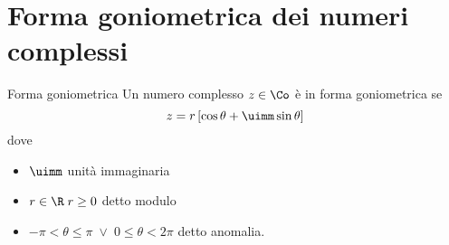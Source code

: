 \chapter{Forma goniometrica dei numeri complessi}
\begin{definizionet}{Forma goniometrica}{}
Un numero complesso $z\in\Co$ è in forma goniometrica se
\[z=r\left[\cos\theta+\uimm\sin\theta \right] \] dove
\begin{itemize}
\item $\uimm$ unità immaginaria
\item $r\in\R\; r\geq 0$ detto modulo
\item $-\pi <\theta\leq\pi\; \vee\; 0\leq\theta<2\pi$ detto anomalia.
\end{itemize}
\end{definizionet}